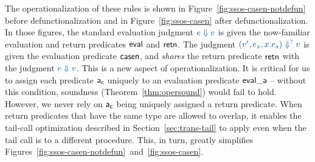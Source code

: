 The operationalization of these rules is shown in
Figure~\ref{fig:ssos-casen-notdefun} before defunctionalization and in
Figure~\ref{fig:ssos-casen} after defunctionalization.  In those
figures, the standard evaluation judgment $\obj{e \Downarrow
  v}$ is given the now-familiar evaluation and return predicates ${\sf
  eval}$ and ${\sf retn}$. The judgment $\obj{(v',e_z,x.e_s)
  \Downarrow^?v}$ is given the evaluation predicate ${\sf casen}$, and {\it
  shares} the return predicate ${\sf retn}$ with the judgment $\obj{e
  \Downarrow v}$. This is a new aspect of operationalization.  It is
critical for us to assign each predicate ${\sf a_c}$ uniquely to an
evaluation predicate ${\sf eval\_a}$ -- without this condition,
soundness (Theorem~\ref{thm:opersound}) would fail to hold. However,
we never rely on ${\sf a_c}$ being uniquely assigned a return
predicate. When return predicates that have the same type are allowed
to overlap, it enables the tail-call optimization described in
Section~\ref{sec:trans-tail} to apply even when the tail call is to a
different procedure. This, in turn, greatly simplifies
Figures~\ref{fig:ssos-casen-notdefun}~and~\ref{fig:ssos-casen}.





